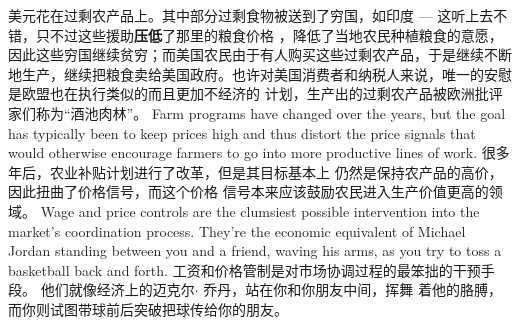 \begin{paracol}{2}
美元花在过剩农产品上。其中部分过剩食物被送到了穷国，如印度 --- 这听上去不错，只不过这些援助\textbf{压低}了那里的粮食价格 ，降低了当地农民种植粮食的意愿，因此这些穷国继续贫穷；而美国农民由于有人购买这些过剩农产品，于是继续不断地生产，继续把粮食卖给美国政府。也许对美国消费者和纳税人来说，唯一的安慰是欧盟也在执行类似的而且更加不经济的
计划，生产出的过剩农产品被欧洲批评家们称为“酒池肉林”。
\switchcolumn*
Farm programs have changed over the years, but the goal has
typically been to keep prices high and thus distort the price signals that would otherwise encourage farmers to go into more
productive lines of work.
\switchcolumn
很多年后，农业补贴计划进行了改革，但是其目标基本上
仍然是保持农产品的高价，因此扭曲了价格信号，而这个价格
信号本来应该鼓励农民进入生产价值更高的领域。
\switchcolumn*
Wage and price controls are the clumsiest possible intervention into the market's coordination process. They're the economic equivalent of Michael Jordan standing between you and
a friend, waving his arms, as you try to toss a basketball back
and forth.
\switchcolumn
工资和价格管制是对市场协调过程的最笨拙的干预手段。
他们就像经济上的迈克尔$\cdot$ 乔丹，站在你和你朋友中间，挥舞
着他的胳膊，而你则试图带球前后突破把球传给你的朋友。


\end{paracol}
